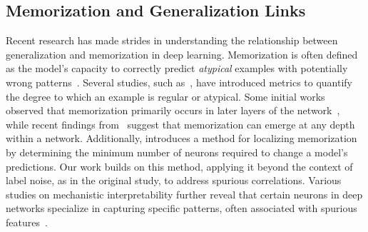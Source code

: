 \subsection{Memorization and Generalization Links} Recent research has made strides in understanding the relationship between generalization and memorization in deep learning. Memorization is often defined as the model's capacity to correctly predict \textit{atypical} examples with potentially wrong patterns~\citep{maini2023can}. Several studies, such as~\citet{jiang2021characterizing, carlini2019distribution}, have introduced metrics to quantify the degree to which an example is regular or atypical. Some initial works observed that memorization primarily occurs in later layers of the network~\citep{baldock2021deep, stephenson2021geometry}, while recent findings from~\citet{maini2023can} suggest that memorization can emerge at any depth within a network. Additionally, \citet{maini2023can} introduces a method for localizing memorization by determining the minimum number of neurons required to change a model’s predictions. Our work builds on this method, applying it beyond the context of label noise, as in the original study, to address spurious correlations. Various studies on mechanistic interpretability further reveal that certain neurons in deep networks specialize in capturing specific patterns, often associated with spurious features~\citep{zenke2017continual,cheung2019superposition,hendel2023context,kalibhat2023identifying}.
